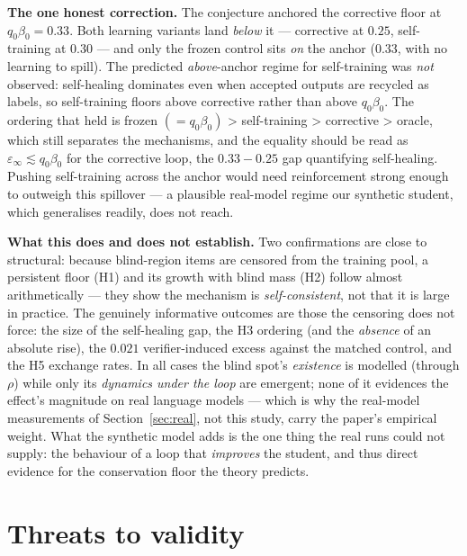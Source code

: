 \documentclass[11pt]{article}
\begin{document}
\textbf{The one honest correction.} The conjecture anchored the
corrective floor at \(q_{0}\beta_{0} = 0.33\). Both learning variants
land \emph{below} it --- corrective at \(0.25\), self-training at
\(0.30\) --- and only the frozen control sits \emph{on} the anchor
(\(0.33\), with no learning to spill). The predicted \emph{above}-anchor
regime for self-training was \emph{not} observed: self-healing dominates
even when accepted outputs are recycled as labels, so self-training
floors above corrective rather than above \(q_{0}\beta_{0}\). The
ordering that held is frozen \(\left( = q_{0}\beta_{0} \right)\)
\textgreater{} self-training \textgreater{} corrective \textgreater{}
oracle, which still separates the mechanisms, and the equality should be
read as \(\varepsilon_{\infty} \lesssim q_{0}\beta_{0}\) for the
corrective loop, the \(0.33 - 0.25\) gap quantifying self-healing.
Pushing self-training across the anchor would need reinforcement strong
enough to outweigh this spillover --- a plausible real-model regime our
synthetic student, which generalises readily, does not reach.

\textbf{What this does and does not establish.} Two confirmations are
close to structural: because blind-region items are censored from the
training pool, a persistent floor (H1) and its growth with blind mass
(H2) follow almost arithmetically --- they show the mechanism is
\emph{self-consistent}, not that it is large in practice. The genuinely
informative outcomes are those the censoring does not force: the size of
the self-healing gap, the H3 ordering (and the \emph{absence} of an
absolute rise), the \(0.021\) verifier-induced excess against the
matched control, and the H5 exchange rates. In all cases the blind
spot's \emph{existence} is modelled (through \(\rho\)) while only its
\emph{dynamics under the loop} are emergent; none of it evidences the
effect's magnitude on real language models --- which is why the
real-model measurements of Section~\ref{sec:real}, not this study, carry
the paper's empirical weight. What the synthetic model adds is the one
thing the real runs could not supply: the behaviour of a loop that
\emph{improves} the student, and thus direct evidence for the
conservation floor the theory predicts.

\section{Threats to validity}
\end{document}
